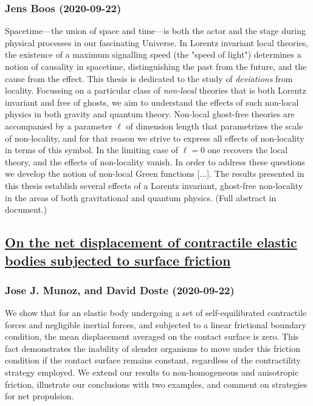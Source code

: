 {\subsubsection*{Jens Boos (2020-09-22)}
Spacetime---the union of space and time---is both the actor and the stage
during physical processes in our fascinating Universe. In Lorentz invariant
local theories, the existence of a maximum signalling speed (the "speed of
light") determines a notion of causality in spacetime, distinguishing the past
from the future, and the cause from the effect. This thesis is dedicated to the
study of \emph{deviations} from locality. Focussing on a particular class of
\emph{non-local} theories that is both Lorentz invariant and free of ghosts, we
aim to understand the effects of such non-local physics in both gravity and
quantum theory. Non-local ghost-free theories are accompanied by a parameter
$\ell$ of dimension length that parametrizes the scale of non-locality, and for
that reason we strive to express all effects of non-locality in terms of this
symbol. In the limiting case of $\ell=0$ one recovers the local theory, and the
effects of non-locality vanish. In order to address these questions we develop
the notion of non-local Green functions [...]. The results presented in this
thesis establish several effects of a Lorentz invariant, ghost-free
non-locality in the areas of both gravitational and quantum physics. (Full
abstract in document.)

\subsection*{\href{http://arxiv.org/abs/2009.10840v1}{On the net displacement of contractile elastic bodies subjected to  surface friction}}
\subsubsection*{Jose J. Munoz, and David Doste (2020-09-22)}
We show that for an elastic body undergoing a set of self-equilibrated
contractile forces and negligible inertial forces, and subjected to a linear
frictional boundary condition, the mean displacement averaged on the contact
surface is zero. This fact demonstrates the inability of slender organisms to
move under this friction condition if the contact surface remains constant,
regardless of the contractility strategy employed. We extend our results to
non-homogeneous and anisotropic friction, illustrate our conclusions with two
examples, and comment on strategies for net propulsion.

}
